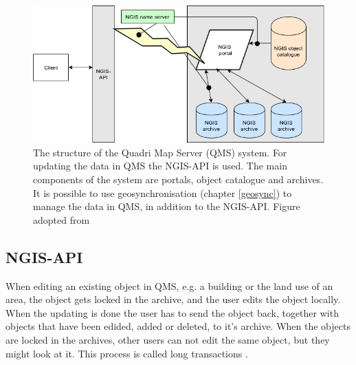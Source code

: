 \begin{figure}[H]
	\centering
	\includegraphics[scale=0.5]{img/ngiss.png}
	\caption{The structure of the Quadri Map Server (QMS) system. For updating the data in QMS the NGIS-API is used.  The main components of the system are portals, object catalogue and archives. It is possible to use geosynchronisation (chapter \ref{geosync}) to manage the data in QMS, in addition to the NGIS-API. Figure adopted from \citep{Kartverket2017b} }
	\label{fig:qmsfig}
\end{figure}

\subsection{NGIS-API}

When editing an existing object in QMS, e.g. a building or the land use of an area, the object gets locked in the archive, and the user edits the object locally. When the updating is done the user has to send the object back, together with objects that have been edided, added or deleted, to it's archive. When the objects are locked in the archives, other users can not edit the same object, but they might look at it. This process is called long transactions \citep{Kartverket2017b}.





